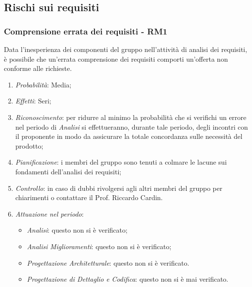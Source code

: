 \subsection{Rischi sui requisiti}
\subsubsection{Comprensione errata dei requisiti - RM1}
Data l'inesperienza dei componenti del gruppo nell'attivit\`a di analisi dei requisiti, \`e possibile che un'errata comprensione dei requisiti comporti un'offerta non conforme alle richieste.
\begin{enumerate}
\item \textit{Probabilit\`a}: Media;
\item \textit{Effetti}: Seri;
\item \textit{Riconoscimento}: per ridurre al minimo la probabilità che si verifichi un errore nel periodo di \textit{Analisi} si effettueranno, durante tale periodo, degli incontri con il proponente in modo da assicurare la totale concordanza sulle necessità del prodotto;
\item \textit{Pianificazione}: i membri del gruppo sono tenuti a colmare le lacune sui fondamenti dell'analisi dei requisiti;
\item \textit{Controllo}: in caso di dubbi rivolgersi agli altri membri del gruppo per chiarimenti o contattare il Prof. Riccardo Cardin.
\item \textit{Attuazione nel periodo}: 
	\begin{itemize}
	\item \textit{Analisi}: questo  non si è verificato;
	\item \textit{Analisi Miglioramenti}: questo  non si è verificato;
	\item \textit{Progettazione Architetturale}: questo  non si è verificato.
	\item \textit{Progettazione di Dettaglio e Codifica}: questo  non si è mai verificato.
	\end{itemize}
\end{enumerate}

